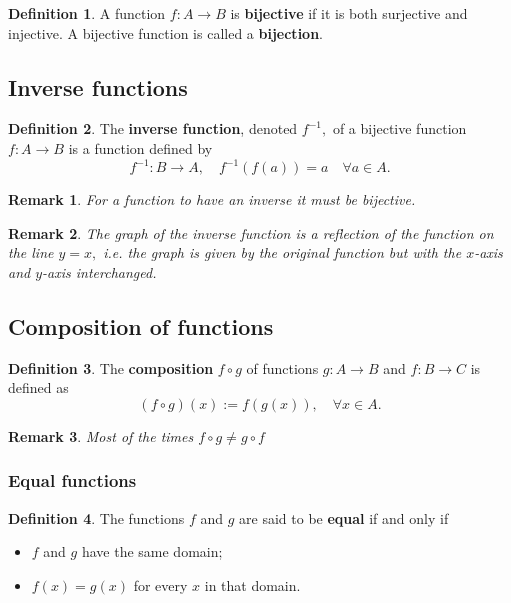 \documentclass[12pt, a4paper]{article}
\newtheorem*{remark}{Remark}
\theoremstyle{definition}
\newtheorem{definition}{Definition}[section]
\theoremstyle{plain}
\begin{document}
\begin{definition}
A function $f : A \to B$ is \textbf{bijective} if it is both surjective and injective. A bijective function is called a \textbf{bijection}.
\end{definition}

\subsection{Inverse functions}

\begin{definition}
The \textbf{inverse function}, denoted $f^{-1},$ of a bijective function $f : A \to B$ is a function defined by $$f^{-1}:B\to A,\quad f^{-1}(f(a))=a \quad \forall a\in A.$$
\end{definition}

\begin{remark}
For a function to have an inverse it must be bijective.
\end{remark}

\begin{remark}
The graph of the inverse function is a reflection of the function on the line $y=x,$ i.e. the graph is given by the original function but with the $x$-axis and $y$-axis interchanged.
\end{remark}

\subsection{Composition of functions}

\begin{definition}
The \textbf{composition} $f\circ g$ of functions $g:A\to B$ and $f:B\to C$ is defined as $$(f\circ g)(x):=f(g(x)), \quad \forall x \in A.$$
\end{definition}

\begin{remark}
Most of the times $f\circ g \neq g\circ f$ 
\end{remark}

\subsubsection{Equal functions}

\begin{definition}
The functions $f$ and $g$ are said to be \textbf{equal} if and only if \begin{itemize}
	\item $f$ and $g$ have the same domain;
	\item $f(x)=g(x)$ for every $x$ in that domain.
\end{itemize}
\end{definition}
\end{document}

